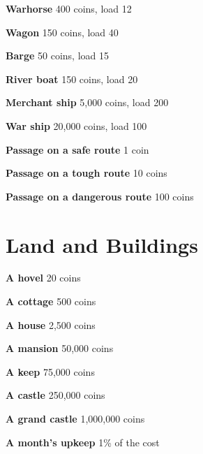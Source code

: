 {\noindent \bfseries Warhorse} \hspace*{\fill} 400 coins, load 12

{\noindent \bfseries Wagon} \hspace*{\fill} 150 coins, load 40

{\noindent \bfseries Barge} \hspace*{\fill} 50 coins, load 15

{\noindent \bfseries River boat} \hspace*{\fill} 150 coins, load 20

{\noindent \bfseries Merchant ship} \hspace*{\fill} 5,000 coins, load 200

{\noindent \bfseries War ship} \hspace*{\fill} 20,000 coins, load 100

{\noindent \bfseries Passage on a safe route} \hspace*{\fill} 1 coin

{\noindent \bfseries Passage on a tough route} \hspace*{\fill} 10 coins

{\noindent \bfseries Passage on a dangerous route} \hspace*{\fill} 100 coins
\section*{Land and Buildings}

{\noindent \bfseries A hovel} \hspace*{\fill} 20 coins

{\noindent \bfseries A cottage} \hspace*{\fill} 500 coins

{\noindent \bfseries A house} \hspace*{\fill} 2,500 coins

{\noindent \bfseries A mansion} \hspace*{\fill} 50,000 coins

{\noindent \bfseries A keep} \hspace*{\fill} 75,000 coins

{\noindent \bfseries A castle} \hspace*{\fill} 250,000 coins

{\noindent \bfseries A grand castle} \hspace*{\fill} 1,000,000 coins

{\noindent \bfseries A month's upkeep} \hspace*{\fill} 1\% of the cost
